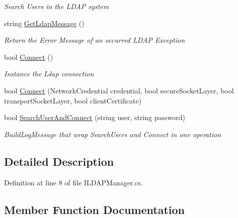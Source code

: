 \begin{DoxyCompactItemize}
\begin{DoxyCompactList}\small\item\em Search Users in the L\+D\+A\+P system \end{DoxyCompactList}\item 
string \hyperlink{interface_l_d_a_p_library_1_1_interfarces_1_1_i_ldap_manager_ab4008f4d3f63519a116f22c7865df892}{Get\+Ldap\+Message} ()
\begin{DoxyCompactList}\small\item\em Return the Error Message of an occurred L\+D\+A\+P Exception \end{DoxyCompactList}\item 
bool \hyperlink{interface_l_d_a_p_library_1_1_interfarces_1_1_i_ldap_manager_ac135485716eca624368a34dd8ddc5001}{Connect} ()
\begin{DoxyCompactList}\small\item\em Instance the Ldap connection \end{DoxyCompactList}\item 
bool \hyperlink{interface_l_d_a_p_library_1_1_interfarces_1_1_i_ldap_manager_a04969d3c8d4bf20e0a8693b7e421c328}{Connect} (Network\+Credential credential, bool secure\+Socket\+Layer, bool transport\+Socket\+Layer, bool client\+Certificate)
\item 
bool \hyperlink{interface_l_d_a_p_library_1_1_interfarces_1_1_i_ldap_manager_a3f70698b6652b8a368bff0db06339047}{Search\+User\+And\+Connect} (string user, string password)
\begin{DoxyCompactList}\small\item\em Build\+Log\+Message that wrap Search\+Users and Connect in one operation \end{DoxyCompactList}\end{DoxyCompactItemize}


\subsection{Detailed Description}


Definition at line 8 of file I\+L\+D\+A\+P\+Manager.\+cs.



\subsection{Member Function Documentation}
\hypertarget{interface_l_d_a_p_library_1_1_interfarces_1_1_i_ldap_manager_a3004e83a4a4bfcb2b6f4beec22baf09a}{}
